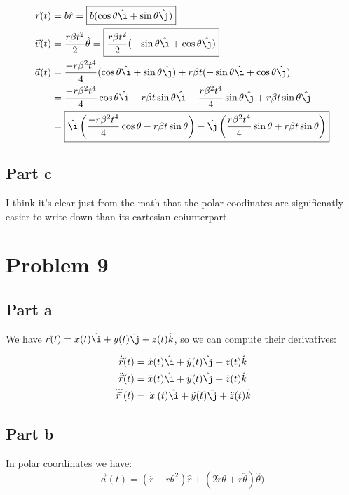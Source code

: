 \documentclass{article}
\theoremstyle{definition}
\numberwithin{equation}{section}
\numberwithin{definition}{section}
\begin{document}
\begin{align*}
	\vec r(t) &= b\hat r = \boxed{b(\cos \theta \hat \i + \sin\theta \hat \j)}\\
	\vec v(t) &=  \frac{r\beta t^2}{2}\hat \theta = \boxed{\frac{r\beta t^2}{2}(-\sin\theta \hat \i + \cos \theta \hat \j)}\\
	\vec a(t) &= \frac{-r\beta^2t^4}{4}(\cos \theta \hat \i + \sin \theta \hat \j) + r\beta t (-\sin \theta \hat \i + \cos \theta \hat \j)\\
	&= \frac{-r\beta^2t^4}{4}\cos\theta \hat \i - r\beta t \sin \theta \hat \i - \frac{r \beta^2t^4}{4} \sin \theta \hat \j + r \beta t \sin \theta \hat \j \\
	&= \boxed{\hat \i \left(\frac{-r\beta^2t^4}{4}\cos \theta - r\beta t \sin \theta\right) - \hat \j \left(\frac{r\beta^2t^4}{4}\sin\theta + r\beta t \sin\theta \right)}
	\end{align*}

\subsection{Part c}

I think it's clear just from the math that the polar coodinates are significnatly easier to write down than its cartesian coiunterpart.

\section{Problem 9}
\subsection{Part a}
We have $\vec r(t) = x(t) \hat \i + y(t) \hat \j + z(t) \hat k$, so we can compute their derivatives:

\begin{align*}
	\dot {\vec r} (t) &= \dot x(t) \hat \i + \dot y(t) \hat \j + \dot z(t) \hat k\\
	\ddot {\vec r}(t) &=  \ddot x(t) \hat \i + \ddot y(t) \hat \j + \ddot z(t) \hat k\\
	\dddot{\vec r}(t) &= \dddot x(t) \hat \i + \ddot y(t) \hat \j + \ddot z(t) \hat k
\end{align*}

\subsection{Part b}
In polar coordinates we have:
\[ \vec a(t) = (\ddot r - r\theta^2)\hat r + (2\dot r \dot \theta + r \ddot \theta)\hat \theta)\]
\end{document}
